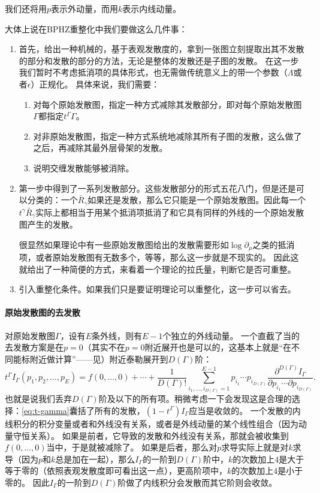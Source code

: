 \documentclass[hyperref, UTF8, a4paper]{ctexart}
\renewcommand{\autoref}{\prettyref}
\begin{document}
我们还将用$p$表示外动量，而用$k$表示内线动量。

大体上说在BPHZ重整化中我们要做这么几件事：
\begin{enumerate}
    \item 首先，给出一种机械的，基于表观发散度的，拿到一张图立刻提取出其不发散的部分和发散的部分的方法，无论是整体的发散还是子图的发散。
    在这一步我们暂时不考虑抵消项的具体形式，也无需做传统意义上的带一个参数（$\Lambda$或者$\epsilon$）正规化。
    具体来说，我们需要：
    \begin{enumerate}
        \item 对每个原始发散图，指定一种方式减除其发散部分，即对每个原始发散图$\Gamma$都指定$t^\Gamma \Gamma$。
        \item 对非原始发散图，指定一种方式系统地减除其所有子图的发散，这么做了之后，再减除其最外层骨架的发散。
        \item 说明交缠发散能够被消除。
    \end{enumerate}
    \item 第一步中得到了一系列发散部分。这些发散部分的形式五花八门，但是还是可以分类的：一个$\bar{R}_\gamma$如果还是发散，那么它只能是一个原始发散图。因此每一个$t^\gamma \bar{R}_\gamma$实际上都相当于用某个抵消项抵消了和它具有同样的外线的一个原始发散图产生的发散。
    
    很显然如果理论中有一些原始发散图给出的发散需要形如$\log \partial_\mu$之类的抵消项，或者原始发散图有无数多个，等等，那么这一步就是不现实的。
    因此这就给出了一种简便的方式，来看着一个理论的拉氏量，判断它是否可重整。
    \item 引入重整化条件。如果我们只是要证明理论可以重整化，这一步可以省去。
\end{enumerate}

\paragraph{原始发散图的去发散} 对原始发散图$\Gamma$，设有$E$条外线，则有$E-1$个独立的外线动量。
一个直截了当的去发散方案是在$p=0$（其实不在$p=0$附近展开也是可以的，这基本上就是“在不同能标附近做计算”——见\autoref{sec:rg}）附近泰勒展开到$D(\Gamma)$阶：
\begin{equation}
    t^\Gamma I_\Gamma(p_1, p_2, \ldots, p_E) = f(0, \ldots, 0) + \cdots + \frac{1}{D(\Gamma)!} \sum_{i_1, \ldots, i_{D(\Gamma)} = 1}^{E-1} p_{i_1} \cdots p_{i_{D(\Gamma)}} \frac{\partial^{D(\Gamma)} I_\Gamma}{\partial p_{i_1} \cdots \partial p_{i_{D(\Gamma)}}}.
    \label{eq:t-gamma}
\end{equation}
也就是说我们丢弃$D(\Gamma)$阶及以下的所有项。稍微考虑一下会发现这是合理的选择：\eqref{eq:t-gamma}囊括了所有的发散，$(1-t^\Gamma) I_\Gamma$应当是收敛的。
一个发散的内线积分的积分变量或者和外线没有关系，或者是外线动量的某个线性组合（因为动量守恒关系）。
如果是前者，它导致的发散和外线没有关系，那就会被收集到$f(0, \ldots, 0)$当中，于是就被减除了。
如果是后者，那么对$p$求导实际上就是对$k$求导（因为$p$和$k$总是加在一起），那么$I_\Gamma$的一阶到$D(\Gamma)$阶中，$k$的次数加上$4$是大于等于零的（依照表观发散度即可看出这一点），更高阶项中，$k$的次数加上$4$是小于零的。
因此$I_\Gamma$的一阶到$D(\Gamma)$阶做了内线积分会发散而其它阶则会收敛。
\end{document}
